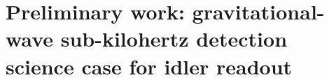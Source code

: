 

\section{Preliminary work: gravitational-wave sub-kilohertz detection science case for idler readout}

